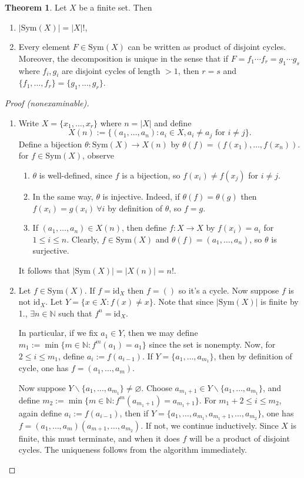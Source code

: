 \documentclass[a4paper]{article}
\newcommand{\Sym}{\text{Sym}}
\newcommand{\id}{\text{id}}
\theoremstyle{definition}
\newtheorem{thm}[defn]{Theorem}
\begin{document}
\begin{thm}
Let $X$ be a finite set. Then
\begin{enumerate}
\item $|\Sym(X)|=|X|!$,
\item Every element $F\in \Sym(X)$ can be written as product of disjoint cycles. Moreover, the decomposition is unique in the sense that if $F=f_1\cdots f_r=g_1\cdots g_s$ where $f_i,g_i$ are disjoint cycles of length $>1$, then $r=s$ and $\{f_1,\ldots,f_r\}=\{g_1,\ldots,g_r\}$.
\end{enumerate}
\end{thm}
\begin{proof}[Proof (nonexaminable)]
\begin{enumerate}
\item Write $X=\{x_1,\ldots,x_r\}$ where $n=|X|$ and define
\[
X(n):=\{(a_1,\ldots,a_n):a_i\in X, a_i\neq a_j \text{ for } i\neq j\}.
\]
Define a bijection $\theta:\Sym(X)\rightarrow X(n)$ by $\theta(f)=(f(x_1),\ldots,f(x_n))$. for $f\in \Sym(X)$, observe
\begin{enumerate}
\item $\theta$ is well-defined, since $f$ is a bijection, so $f(x_i)\neq f(x_j)$ for $i\neq j$.
\item In the same way, $\theta$ is injective. Indeed, if $\theta(f)=\theta(g)$ then $f(x_i)=g(x_i) \ \forall i$ by definition of $\theta$, so $f=g$.
\item If $(a_1,\ldots,a_n)\in X(n)$, then define $f:X\rightarrow X$ by $f(x_i)=a_i$ for $1\leq i\leq n$. Clearly, $f\in \Sym(X)$ and $\theta(f) = (a_1,\ldots,a_n)$, so $\theta$ is surjective.
\end{enumerate}
It follows that $|\Sym(X)|=|X(n)|=n!$.
\item Let $f\in\Sym(X)$. If $f=\id_X$ then $f=()$ so it's a cycle. Now suppose $f$ is not $\id_X$. Let $Y=\{x\in X:f(x)\neq x\}$. Note that since $|\Sym(X)|$ is finite by 1., $\exists n\in \mathbb N$ such that $f^n=\id_X$.

In particular, if we fix $a_1\in Y$, then we may define $m_1:=\min\{m\in \mathbb N:f^m(a_1)=a_1\}$ since the set is nonempty. Now, for $2\leq i\leq m_1$, define $a_i:=f(a_{i-1})$. If $Y=\{a_1,\ldots,a_{m_1}\}$, then by definition of cycle, one has $f=(a_1,\ldots,a_m)$.

Now suppose $Y\backslash \{a_1,\ldots,a_{m_1}\}\neq \varnothing$. Choose $a_{m_1+1} \in Y\backslash \{a_1,\ldots,a_{m_1}\}$, and define $m_2:=\min\{m\in \mathbb N:f^m(a_{m_1+1})=a_{m_1+1}\}$. For $m_1+2\leq i\leq m_2$, again define $a_i:=f(a_{i-1})$, then if $Y=\{a_1,\ldots,a_{m_1},a_{m_1+1},\ldots,a_{m_2}\}$, one has $f=(a_1,\ldots,a_m)(a_{m+1},\ldots,a_{m_2})$. If not, we continue inductively. Since $X$ is finite, this must terminate, and when it does $f$ will be a product of disjoint cycles. The uniqueness follows from the algorithm immediately.
\end{enumerate}
\end{proof}
\end{document}
